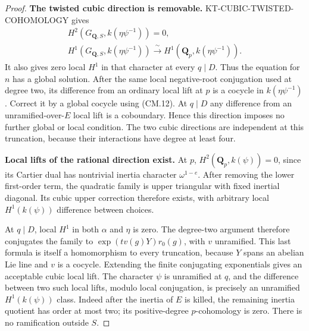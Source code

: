 \documentclass[11pt,a4paper]{article}
\theoremstyle{definition}
\renewcommand{\paragraph}[1]{\par\smallskip\noindent\textbf{#1}\quad\ignorespaces}
\begin{document}
\begin{proof}
\paragraph{The twisted cubic direction is removable.}
KT-CUBIC-TWISTED-COHOMOLOGY gives
\[
\begin{gathered}
 H^2(G_{\mathbf Q,S},k(\eta\psi^{-1}))=0,\\
 H^1(G_{\mathbf Q,S},k(\eta\psi^{-1}))
       \xrightarrow{\ \sim\ }H^1(\mathbf Q_p,k(\eta\psi^{-1})).
\end{gathered}                                                 \tag{CM.12}
\]
It also gives zero local $H^1$ in that character at every
$q\mid D$.  Thus the equation for $n$ has a global solution.
After the same local negative-root conjugation used at degree
two, its difference from an ordinary local lift at $p$ is a
cocycle in $k(\eta\psi^{-1})$.  Correct it by a global cocycle
using (CM.12).  At $q\mid D$ any difference from an
unramified-over-$E$ local lift is a coboundary.  Hence this
direction imposes no further global or local condition.
The two cubic directions are independent at this truncation,
because their interactions have degree at least four.

\paragraph{Local lifts of the rational direction exist.}
At $p$, $H^2(\mathbf Q_p,k(\psi))=0$, since its Cartier
dual has nontrivial inertia character $\omega^{1-e}$.
After removing the lower first-order term, the quadratic
family is upper triangular with fixed inertial diagonal.
Its cubic upper correction therefore exists, with arbitrary
local $H^1(k(\psi))$ difference between choices.

At $q\mid D$, local $H^1$ in both $\alpha$ and $\eta$ is
zero.  The degree-two argument therefore conjugates the
family to $\exp(t v(g)Y)r_0(g)$, with $v$ unramified.
This last formula is itself a homomorphism to every
truncation, because $Y$ spans an abelian Lie line and $v$
is a cocycle.  Extending the finite conjugating exponentials
gives an acceptable cubic local lift.  The character $\psi$
is unramified at $q$, and the difference between two such
local lifts, modulo local conjugation, is precisely an
unramified $H^1(k(\psi))$ class.  Indeed after the inertia
of $E$ is killed, the remaining inertia quotient has order
at most two; its positive-degree $p$-cohomology is zero.
There is no ramification outside $S$.


\end{proof}
\end{document}
